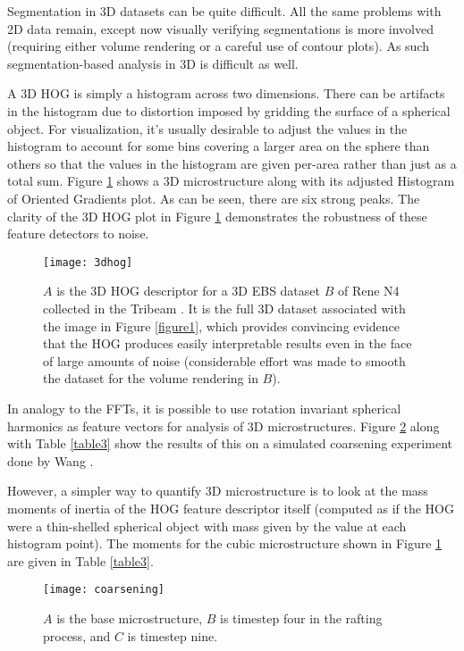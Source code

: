\documentclass[review]{elsarticle}
\begin{document}
	Segmentation in 3D datasets can be quite difficult. All the same problems with 2D data remain, except now visually verifying segmentations is more involved (requiring either volume rendering or a careful use of contour plots). As such segmentation-based analysis in 3D is difficult as well.

	A 3D HOG is simply a histogram across two dimensions. There can be artifacts in the histogram due to distortion imposed by gridding the surface of a spherical object. For visualization, it's usually desirable to adjust the values in the histogram to account for some bins covering a larger area on the sphere than others so that the values in the histogram are given per-area rather than just as a total sum. Figure \ref{figure4} shows a 3D microstructure along with its adjusted Histogram of Oriented Gradients plot. As can be seen, there are six strong peaks. The clarity of the 3D HOG plot in Figure \ref{figure4} demonstrates the robustness of these feature detectors to noise.
	
	\begin{figure}[!ht]
  		\centering
    	\texttt{[image: 3dhog]}
  		\caption{ $A$ is the 3D HOG descriptor for a 3D EBS dataset $B$ of Rene N4 collected in the Tribeam \cite{tribeam}. It is the full 3D dataset associated with the image in Figure \ref{figure1}, which provides convincing evidence that the HOG produces easily interpretable results even in the face of large amounts of noise (considerable effort was made to smooth the dataset for the volume rendering in $B$). }
  		\label{figure4}
	\end{figure}

	In analogy to the FFTs, it is possible to use rotation invariant spherical harmonics \cite{spherical} as feature vectors for analysis of 3D microstructures. Figure \ref{figure8} along with Table \ref{table3} show the results of this on a simulated coarsening experiment done by Wang \cite{ywang2}.
	
	However, a simpler way to quantify 3D microstructure is to look at the mass moments of inertia of the HOG feature descriptor itself (computed as if the HOG were a thin-shelled spherical object with mass given by the value at each histogram point). The moments for the cubic microstructure shown in Figure \ref{figure4} are given in Table \ref{table3}.
	
	\begin{figure}[!ht]
  		\centering
    	\texttt{[image: coarsening]}
  		\caption{ $A$ is the base microstructure, $B$ is timestep four in the rafting process, and $C$ is timestep nine. }
  		\label{figure8}
	\end{figure}
	
\end{document}

